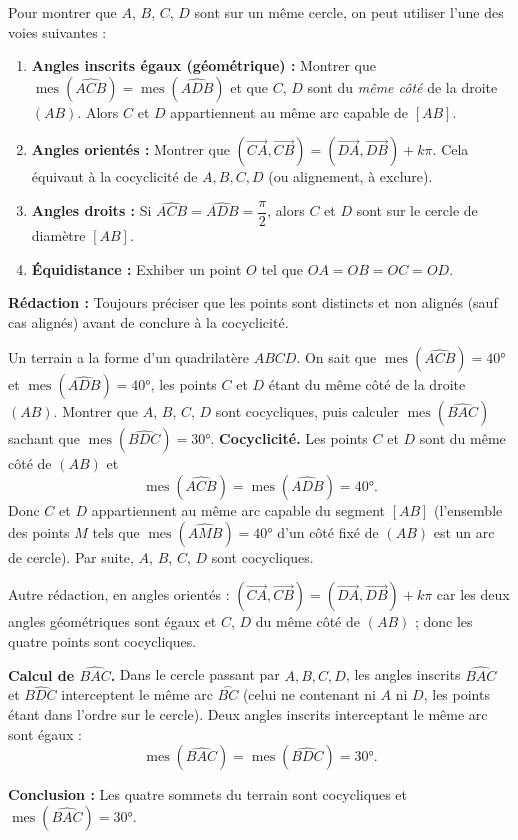 \documentclass[11pt]{article}
\begin{document}
\begin{methode}
Pour montrer que $A$, $B$, $C$, $D$ sont sur un même cercle, on peut utiliser l'une des voies suivantes :
\begin{enumerate}
\item \textbf{Angles inscrits égaux (géométrique) :} Montrer que $\operatorname{mes}(\widehat{ACB})=\operatorname{mes}(\widehat{ADB})$ et que $C$, $D$ sont du \emph{même côté} de la droite $(AB)$. Alors $C$ et $D$ appartiennent au même arc capable de $[AB]$.
\item \textbf{Angles orientés :} Montrer que $(\overrightarrow{CA},\overrightarrow{CB})=(\overrightarrow{DA},\overrightarrow{DB})+k\pi$. Cela équivaut à la cocyclicité de $A,B,C,D$ (ou alignement, à exclure).
\item \textbf{Angles droits :} Si $\widehat{ACB}=\widehat{ADB}=\dfrac{\pi}{2}$, alors $C$ et $D$ sont sur le cercle de diamètre $[AB]$.
\item \textbf{Équidistance :} Exhiber un point $O$ tel que $OA=OB=OC=OD$.
\end{enumerate}
\textbf{Rédaction :} Toujours préciser que les points sont distincts et non alignés (sauf cas alignés) avant de conclure à la cocyclicité.
\end{methode}

\begin{exoresolu}
Un terrain a la forme d'un quadrilatère $ABCD$. On sait que $\operatorname{mes}(\widehat{ACB})=40°$ et $\operatorname{mes}(\widehat{ADB})=40°$, les points $C$ et $D$ étant du même côté de la droite $(AB)$. Montrer que $A$, $B$, $C$, $D$ sont cocycliques, puis calculer $\operatorname{mes}(\widehat{BAC})$ sachant que $\operatorname{mes}(\widehat{BDC})=30°$.
\tcblower
\textbf{Cocyclicité.} Les points $C$ et $D$ sont du même côté de $(AB)$ et
\[
\operatorname{mes}(\widehat{ACB})=\operatorname{mes}(\widehat{ADB})=40°.
\]
Donc $C$ et $D$ appartiennent au même arc capable du segment $[AB]$ (l'ensemble des points $M$ tels que $\operatorname{mes}(\widehat{AMB})=40°$ d'un côté fixé de $(AB)$ est un arc de cercle). Par suite, $A$, $B$, $C$, $D$ sont cocycliques.

Autre rédaction, en angles orientés : $(\overrightarrow{CA},\overrightarrow{CB})=(\overrightarrow{DA},\overrightarrow{DB})+k\pi$ car les deux angles géométriques sont égaux et $C$, $D$ du même côté de $(AB)$ ; donc les quatre points sont cocycliques.

\textbf{Calcul de $\widehat{BAC}$.} Dans le cercle passant par $A,B,C,D$, les angles inscrits $\widehat{BAC}$ et $\widehat{BDC}$ interceptent le même arc $\overset{\frown}{BC}$ (celui ne contenant ni $A$ ni $D$, les points étant dans l'ordre sur le cercle). Deux angles inscrits interceptant le même arc sont égaux :
\[
\operatorname{mes}(\widehat{BAC})=\operatorname{mes}(\widehat{BDC})=30°.
\]

\textbf{Conclusion :} Les quatre sommets du terrain sont cocycliques et $\operatorname{mes}(\widehat{BAC})=30°$.
\end{exoresolu}
\end{document}
